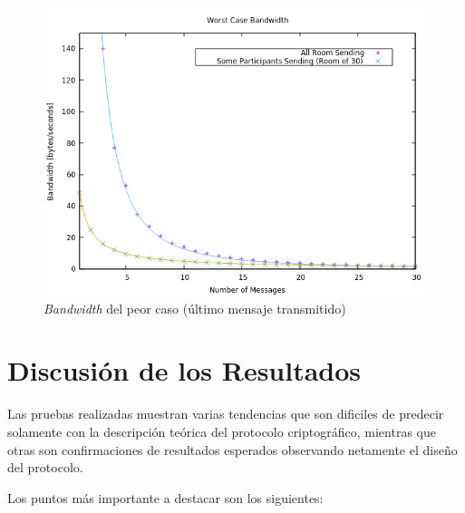 \begin{figure}[H]
  \centering
    \includegraphics[scale=0.7]{logs/bandwidth.png}
  \caption{\emph{Bandwidth} del peor caso (último mensaje transmitido)}
  \label{fig:times-variable}
\end{figure}

\section{Discusión de los Resultados}

Las pruebas realizadas muestran varias tendencias que son dificiles de predecir 
solamente con la descripción teórica del protocolo criptográfico, mientras que otras 
son confirmaciones de resultados esperados observando netamente el diseño del 
protocolo.

Los puntos más importante a destacar son los siguientes:


